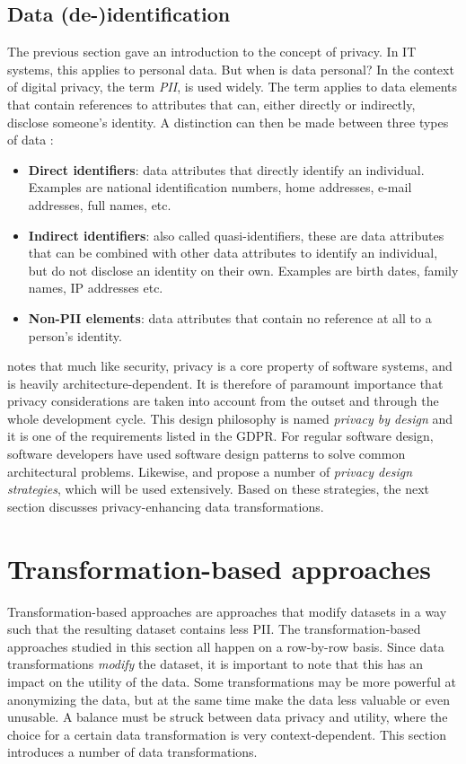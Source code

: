 \subsection{Data (de-)identification}
\label{sec:data-deid}
The previous section gave an introduction to the concept of privacy. In IT systems, this applies to personal data. But when is data personal? In the context of digital privacy, the term \textit{\gls{PII}}, is used widely. The term applies to data elements that contain references to attributes that can, either directly or indirectly, disclose someone's identity. A distinction can then be made between three types of data \citep{de-id-taxonomy}:
\begin{itemize}
    \item \textbf{Direct identifiers}: data attributes that directly identify an individual. Examples are national identification numbers, home addresses, e-mail addresses, full names, etc.
    \item \textbf{Indirect identifiers}: also called quasi-identifiers, these are data attributes that can be combined with other data attributes to identify an individual, but do not disclose an identity on their own. Examples are birth dates, family names, IP addresses etc.
    \item \textbf{Non-PII elements}: data attributes that contain no reference at all to a person's identity.
\end{itemize}
\noindent \citeauthor{privacy-design-strategies} notes that much like security, privacy is a core property of software systems, and is heavily architecture-dependent. It is therefore of paramount importance that privacy considerations are taken into account from the outset and through the whole development cycle. This design philosophy is named \textit{privacy by design} and it is one of the requirements listed in the GDPR. For regular software design, software developers have used software design patterns to solve common architectural problems. Likewise, \citet{privacy-design-strategies} and \citet{de-id-taxonomy} propose a number of \textit{privacy design strategies}, which will be used extensively. Based on these strategies, the next section discusses privacy-enhancing data transformations.

\section{Transformation-based approaches}
\label{sec:transformation-approaches}
Transformation-based approaches are approaches that modify datasets in a way such that the resulting dataset contains less \gls{PII}. The transformation-based approaches studied  in this section all happen on a row-by-row basis. Since data transformations \textit{modify} the dataset, it is important to note that this has an impact on the utility of the data. Some transformations may be more powerful at anonymizing the data, but at the same time make the data less valuable or even unusable. A balance must be struck between data privacy and utility, where the choice for a certain data transformation is very context-dependent. This section introduces a number of data transformations.

